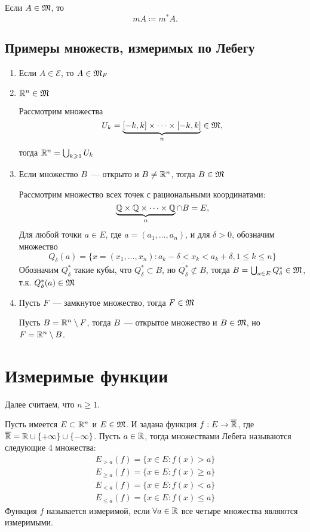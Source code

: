 \documentclass[main]{subfiles}
\begin{document}
\begin{definition}
    Если $A \in \mathfrak{M}$, то
    \[m A \coloneq m^* A.\]
\end{definition}

\subsection{Примеры множеств, измеримых по Лебегу}
\begin{enumerate}
    \item Если $A \in \mathcal{E}$, то $A \in \mathfrak{M}_F$
    \item $\mathbb{R}^n \in \mathfrak{M}$

          Рассмотрим множества
          \[U_k = \underbrace{[-k, k] \times \dotsb \times [-k, k]}_{n} \in \mathfrak{M},\]
          тогда $\mathbb{R}^n = \bigcup_{k \geqslant 1} U_k$
    \item Если множество $B$~--- открыто и $B \neq \mathbb{R}^n$, тогда $B \in \mathfrak{M}$

          Рассмотрим множество всех точек с рациональными координатами:
          \[\underbrace{\mathbb{Q} \times \mathbb{Q} \times \dotsb \times \mathbb{Q}}_n \cap B = E,\]
          Для любой точки $a \in E$, где $a = (a_1, \dotsc, a_n)$, и для $\delta >0$, обозначим множество
          \[Q_\delta(a) = \{x = (x_1, \dotsc, x_n):  a_k - \delta < x_k < a_k + \delta, 1 \le k \le n\}\]
          Обозначим $Q_\delta^*$ такие кубы, что $Q^*_\delta \subset B$, но $\overline{Q^*_\delta} \not \subset B$, тогда $B = \bigcup_{a \in E} Q_\delta^* \in \mathfrak{M}$, т.к. $Q_\delta^*(a) \in \mathfrak{M}$
    \item Пусть $F$~--- замкнутое множество, тогда $F \in \mathfrak{M}$

          Пусть $B = \mathbb{R}^n \setminus F$, тогда $B$~--- открытое множество и $B \in \mathfrak{M}$, но $F = \mathbb{R}^n \setminus B$.
\end{enumerate}

\section{Измеримые функции}
Далее считаем, что $n \ge 1$.
\begin{definition}
    Пусть имеется $E \subset \mathbb{R}^n$ и $E \in \mathfrak{M}$.
    И задана функция $f: E \to \overline{\mathbb{R}}$, где $\overline{\mathbb{R}} = \mathbb{R} \cup \{+\infty\} \cup \{-\infty\}$.
    Пусть $a \in \mathbb{R}$, тогда множествами Лебега называются следующие 4 множества:
    \begin{gather*}
        E_{> a}(f) = \{x \in E: f(x) > a\} \\
        E_{\ge a}(f) = \{x \in E: f(x) \ge a\} \\
        E_{< a}(f) = \{x \in E: f(x) < a\} \\
        E_{\le a}(f) = \{x \in E: f(x) \le a\}
    \end{gather*}
    Функция $f$ называется измеримой, если $\forall a \in \mathbb{R}$ все четыре множества являются измеримыми.
\end{definition}
\end{document}
